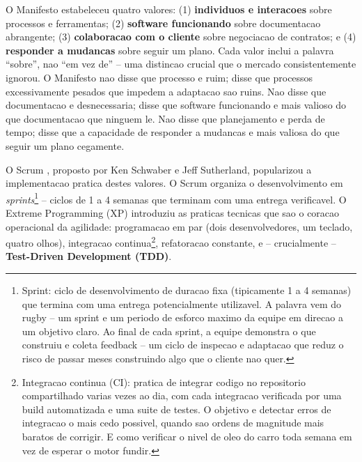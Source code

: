 \documentclass[12pt,a4paper,oneside,sumario=tradicional,chapter=TITLE,section=TITLE,subsection=TITLE,english,brazil]{abntex2}
\begin{document}
O Manifesto estabeleceu quatro valores: (1) \textbf{individuos e interacoes} sobre processos e ferramentas; (2) \textbf{software funcionando} sobre documentacao abrangente; (3) \textbf{colaboracao com o cliente} sobre negociacao de contratos; e (4) \textbf{responder a mudancas} sobre seguir um plano. Cada valor inclui a palavra ``sobre'', nao ``em vez de'' -- uma distincao crucial que o mercado consistentemente ignorou. O Manifesto nao disse que processo e ruim; disse que processos excessivamente pesados que impedem a adaptacao sao ruins. Nao disse que documentacao e desnecessaria; disse que software funcionando e mais valioso do que documentacao que ninguem le. Nao disse que planejamento e perda de tempo; disse que a capacidade de responder a mudancas e mais valiosa do que seguir um plano cegamente.

O Scrum \cite{schwaber2004agile}, proposto por Ken Schwaber e Jeff Sutherland, popularizou a implementacao pratica destes valores. O Scrum organiza o desenvolvimento em \textit{sprints}\footnote{Sprint: ciclo de desenvolvimento de duracao fixa (tipicamente 1 a 4 semanas) que termina com uma entrega potencialmente utilizavel. A palavra vem do rugby -- um sprint e um periodo de esforco maximo da equipe em direcao a um objetivo claro. Ao final de cada sprint, a equipe demonstra o que construiu e coleta feedback -- um ciclo de inspecao e adaptacao que reduz o risco de passar meses construindo algo que o cliente nao quer.} -- ciclos de 1 a 4 semanas que terminam com uma entrega verificavel. O Extreme Programming (XP) \cite{beck2004extreme} introduziu as praticas tecnicas que sao o coracao operacional da agilidade: programacao em par (dois desenvolvedores, um teclado, quatro olhos), integracao continua\footnote{Integracao continua (CI): pratica de integrar codigo no repositorio compartilhado varias vezes ao dia, com cada integracao verificada por uma build automatizada e uma suite de testes. O objetivo e detectar erros de integracao o mais cedo possivel, quando sao ordens de magnitude mais baratos de corrigir. E como verificar o nivel de oleo do carro toda semana em vez de esperar o motor fundir.}, refatoracao constante, e -- crucialmente -- \textbf{Test-Driven Development (TDD)}.
\end{document}
